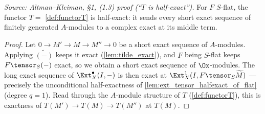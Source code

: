 \begin{lemma}

  \label{lem:functorT_halfexact}
  \textit{Source: Altman--Kleiman, §1, (1.3) proof (``$T$ is half-exact'').}
  For $F$ $S$-flat, the functor $T = $ \cref{def:functorT} is half-exact: it sends
  every short exact sequence of finitely generated $A$-modules to a complex exact
  at its middle term.
  \begin{proof}
    Let $0 \to M' \to M \to M'' \to 0$ be a short exact sequence of $A$-modules.
    Applying $\widetilde{(-)}$ keeps it exact (\cref{lem:tilde_exact}), and $F$
    being $S$-flat keeps $F\tensor_S(-)$ exact, so we obtain a short exact sequence
    of $\Ox$-modules. The long exact sequence of $\Ext^\bullet_X(I,-)$ is then
    exact at $\Ext^1_X(I, F\tensor_S\widetilde M)$ — precisely the unconditional
    half-exactness of \cref{lem:ext_tensor_halfexact_of_flat} (degree $q=1$). Read
    through the $A$-module structure of $T$ (\cref{def:functorT}), this is exactness
    of $T(M') \to T(M) \to T(M'')$ at $T(M)$.
  \end{proof}
\end{lemma}

